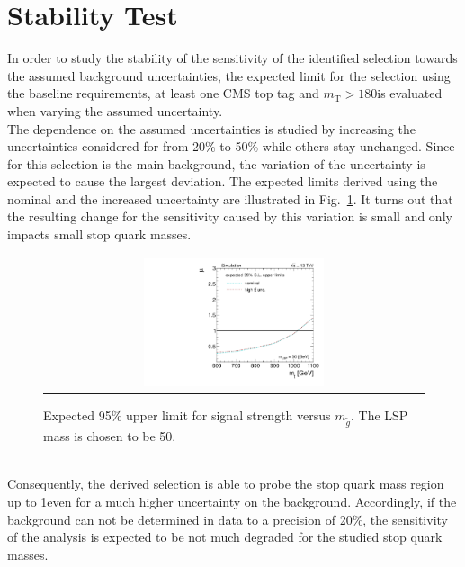 
\section{Stability Test}
\label{sec:stop_syst}
In order to study the stability of the sensitivity of the identified selection towards the assumed background uncertainties, the expected limit for the selection using the baseline requirements, at least one CMS top tag and $m_\mathrm{T} > 180$\gev is evaluated when varying the assumed \ttbar uncertainty. \\
The dependence on the assumed uncertainties is studied by increasing the uncertainties considered for \ttbar from 20\% to 50\% while others stay unchanged. Since for this selection \ttbar is the main background, the variation of the \ttbar uncertainty is expected to cause the largest deviation. 
The expected limits derived using the nominal and the increased \ttbar uncertainty are illustrated in Fig.~\ref{fig:stop_varied_limit}. It turns out that the resulting change for the sensitivity caused by this variation is small and only impacts small stop quark masses.  
\begin{figure}[!b]
  \centering
  \begin{tabular}{c}
                \includegraphics[width=0.49\textwidth]{figures/limitplot4BinSel_SystVariation_LSP50.pdf} 
  \end{tabular}
  \caption{Expected 95\% upper limit for signal strength versus $m_{\tilde{g}}$. The LSP mass is chosen to be 50\gev.}
  \label{fig:stop_varied_limit}
\end{figure}
\\
Consequently, the derived selection is able to probe the stop quark mass region up to 1\tev even for a much higher uncertainty on the \ttbar background. Accordingly, if the \ttbar background can not be determined in data to a precision of 20\%, the sensitivity of the analysis is expected to be not much degraded for the studied stop quark masses.              

